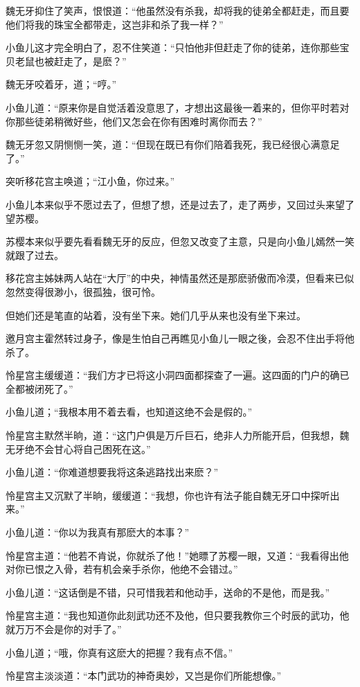 \documentclass[12pt,oneside]{book}
\begin{document}
魏无牙抑住了笑声，恨恨道：``他虽然没有杀我，却将我的徒弟全都赶走，而且要他们将我的珠宝全都带走，这岂非和杀了我一样？''

小鱼儿这才完全明白了，忍不住笑道：``只怕他非但赶走了你的徒弟，连你那些宝贝老鼠也被赶走了，是麽？''

魏无牙咬着牙，道；``哼。''

小鱼儿道：``原来你是自觉活着没意思了，才想出这最後一着来的，但你平时若对你那些徒弟稍微好些，他们又怎会在你有困难时离你而去？''

魏无牙忽又阴恻恻一笑，道：``但现在既已有你们陪着我死，我已经很心满意足了。''

突听移花宫主唤道；``江小鱼，你过来。''

小鱼儿本来似乎不愿过去了，但想了想，还是过去了，走了两步，又回过头来望了望苏樱。

苏樱本来似乎要先看看魏无牙的反应，但忽又改变了主意，只是向小鱼儿嫣然一笑就跟了过去。

移花宫主姊妹两人站在``大厅''的中央，神情虽然还是那麽骄傲而冷漠，但看来已似忽然变得很渺小，很孤独，很可怜。

但她们还是笔直的站着，没有坐下来。她们几乎从来也没有坐下来过。

邀月宫主霍然转过身子，像是生怕自己再瞧见小鱼儿一眼之後，会忍不住出手将他杀了。

怜星宫主缓缓道：``我们方才已将这小洞四面都探查了一遍。这四面的门户的确已全都被闭死了。''

小鱼儿道；``我根本用不着去看，也知道这绝不会是假的。''

怜星宫主默然半晌，道：``这门户俱是万斤巨石，绝非人力所能开启，但我想，魏无牙绝不会甘心将自己困死在这。''

小鱼儿道：``你难道想要我将这条逃路找出来麽？''

怜星宫主又沉默了半晌，缓缓道：``我想，你也许有法子能自魏无牙口中探听出来。''

小鱼儿道：``你以为我真有那麽大的本事？''

怜星宫主道：``他若不肯说，你就杀了他！''她瞟了苏樱一眼，又道：``我看得出他对你已恨之入骨，若有机会亲手杀你，他绝不会错过。''

小鱼儿道：``这话倒是不错，只可惜我若和他动手，送命的不是他，而是我。''

怜星宫主道：``我也知道你此刻武功还不及他，但只要我教你三个时辰的武功，他就万万不会是你的对手了。''

小鱼儿道；``哦，你真有这麽大的把握？我有点不信。''

怜星宫主淡淡道：``本门武功的神奇奥妙，又岂是你们所能想像。''
\end{document}
